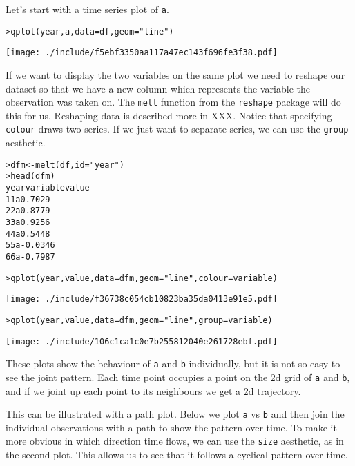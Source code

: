 Let's start with a time series plot of {\tt a}.

\begin{alltt}
> qplot(year, a, data = df, geom = "line")
\end{alltt}
\texttt{[image: ./include/f5ebf3350aa117a47ec143f696fe3f38.pdf]}
\begin{alltt}

\end{alltt}

If we want to display the two variables on the same plot we need to reshape our dataset so that we have a new column which represents the variable the observation was taken on.  The {\tt melt} function from the {\tt reshape} package will do this for us.  Reshaping data is described more in XXX.  Notice that specifying {\tt colour} draws two series.  If we just want to separate series, we can use the {\tt group} aesthetic.

\begin{alltt}
> dfm <- melt(df, id = "year")
> head(dfm)
  year variable   value
1    1        a  0.7029
2    2        a  0.8779
3    3        a  0.9256
4    4        a  0.5448
5    5        a -0.0346
6    6        a -0.7987

> qplot(year, value, data = dfm, geom = "line", colour = variable)
\end{alltt}
\texttt{[image: ./include/f36738c054cb10823ba35da0413e91e5.pdf]}
\begin{alltt}

> qplot(year, value, data = dfm, geom = "line", group = variable)
\end{alltt}
\texttt{[image: ./include/106c1ca1c0e7b255812040e261728ebf.pdf]}
\begin{alltt}

\end{alltt}

These plots show the behaviour of {\tt a} and {\tt b} individually, but it is not so easy to see the joint pattern.  Each time point occupies a point on the 2d grid of {\tt a} and {\tt b}, and if we joint up each point to its neighbours we get a 2d trajectory.

This can be illustrated with a path plot.  Below we plot {\tt a} vs {\tt b} and then join the individual observations with a path to show the pattern over time.  To make it more obvious in which direction time flows, we can use the {\tt size} aesthetic, as in the second plot.   This allows us to see that it follows a cyclical pattern over time.

